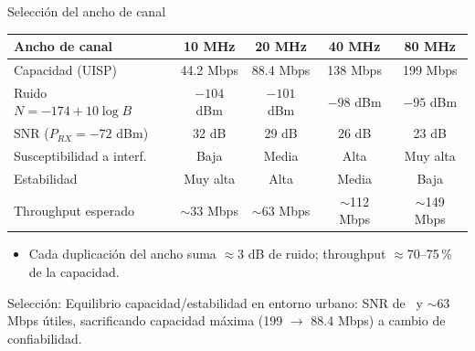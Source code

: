\begin{frame}{Selección del ancho de canal}
  \small
  \begin{tabular}{@{}lcccc@{}}
    \toprule
    \textbf{Ancho de canal} & 10 MHz & \cellcolor{naranja!25}\textbf{20 MHz} & 40 MHz & 80 MHz \\ \midrule
    Capacidad (UISP) & 44.2 Mbps & \cellcolor{naranja!25}88.4 Mbps & 138 Mbps & 199 Mbps \\
    Ruido $N=-174+10\log B$ & $-104$ dBm & \cellcolor{naranja!25}$-101$ dBm & $-98$ dBm & $-95$ dBm \\
    SNR ($P_{RX}=-72$ dBm) & 32 dB & \cellcolor{naranja!25}29 dB & 26 dB & 23 dB \\
    Susceptibilidad a interf. & Baja & \cellcolor{naranja!25}Media & Alta & Muy alta \\
    Estabilidad & Muy alta & \cellcolor{naranja!25}Alta & Media & Baja \\
    Throughput esperado & $\sim$33 Mbps & \cellcolor{naranja!25}$\sim$63 Mbps & $\sim$112 Mbps & $\sim$149 Mbps \\
    \bottomrule
  \end{tabular}
  \vspace{6pt}
  \begin{itemize}
    \item Cada duplicación del ancho suma $\approx$3 dB de ruido; throughput $\approx$70--75\,\% de la capacidad.
  \end{itemize}
  \begin{alertblock}{Selección: \EAcanal}
    Equilibrio capacidad/estabilidad en entorno urbano: SNR de \EAsnr\ y $\sim$63 Mbps útiles,
    sacrificando capacidad máxima (199 $\to$ 88.4 Mbps) a cambio de confiabilidad.
  \end{alertblock}
\end{frame}

